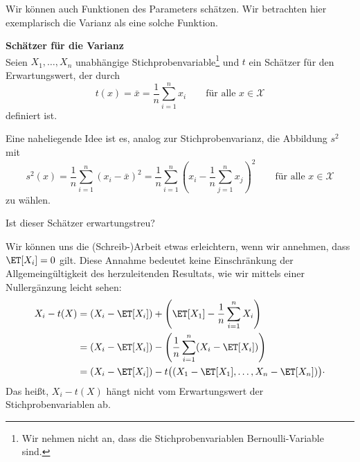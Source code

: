 Wir können auch Funktionen des Parameters schätzen.
Wir betrachten hier exemplarisch die Varianz als eine solche Funktion.

\begin{bsp}\textbf{\gls{Schätzer} für die Varianz}  \\
    Seien $X_1,\dots,X_n$ unabhängige \gls{Stichprobenvariable}\footnote{Wir nehmen nicht an, dass die Stichprobenvariablen \gls{Bernoulli-Variable} sind.} und $t$ ein \gls{Schätzer} für den Erwartungswert, der durch
    \[
        t(x) = \bar x = \frac1n\sum_{i=1}^n x_i \qquad \text{für alle } x\in\mathcal X
    \]
    definiert ist.

    Eine naheliegende Idee ist es, analog zur Stichprobenvarianz, die Abbildung $s^2$ mit
    \[
        s^2(x) = \frac1n\sum_{i=1}^n (x_i-\bar x)^2 = \frac1n\sum_{i=1}^n \left(x_i - \frac1n\sum_{j=1}^n x_j\right)^2 \qquad \text{für alle } x\in\mathcal X
    \]
    zu wählen.

    Ist dieser \gls{Schätzer} erwartungstreu?

    Wir können uns die (Schreib-)Arbeit etwas erleichtern, wenn wir annehmen, dass $\ET[X_i]=0$ gilt.
    Diese Annahme bedeutet keine Einschränkung der Allgemeingültigkeit des herzuleitenden Resultats, wie wir mittels einer Nullergänzung leicht sehen:
    \begin{align*}
        X_i - t(X) &= (X_i-\ET[X_i]) + \left(\ET[X_1] - \frac1n\sum_{i=1}^n X_i\right) \\
        &= (X_i-\ET[X_i]) - \left(\frac1n\sum_{i=1}^n (X_i-\ET[X_i])\right) \\
        &= (X_i-\ET[X_i]) - t\big((X_1-\ET[X_1],\dots,X_n-\ET[X_n])\big) \cdot
    \end{align*}
    Das heißt, $X_i-t(X)$ hängt nicht vom Erwartungswert der \gls{Stichprobenvariable}n ab.


\end{bsp}
